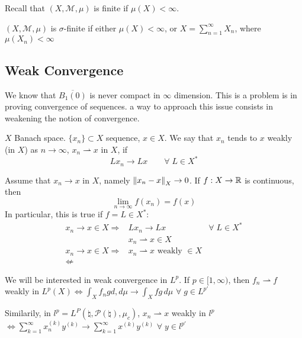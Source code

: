 Recall that \((X, \mathcal{M}, \mu)\) is finite if \(\mu(X) < \infty\).

\begin{definition}
    \((X, \mathcal{M}, \mu)\) is \(\sigma\)-finite if either \(\mu(X) < \infty\), or \(X = \sum_{n=1}^\infty X_n\), where \(\mu(X_n) < \infty\)
\end{definition}

\subsection*{Weak Convergence}

We know that \(\overline{B_1(0)}\) is never compact in \(\infty\) dimension. This is a problem is in proving convergence of sequences. a way to approach this issue consists in weakening the notion of convergence.
\begin{definition}
    \(X\) Banach space. \(\{x_n\} \subset X\) sequence, \(x \in X\). We say that \(x_n\) tends to \(x\) weakly (in \(X\)) as \(n \to \infty\), \(x_n \rightharpoonup x\) in \(X\), if 
    \[
        L x_n \to Lx \qquad \forall \; L \in X^*
    \]
\end{definition}
\begin{remark}
    Assume that \(x_n \to x\) in \(X\), namely \(\norm{x_n -x}_X \to 0\). If \(f:X \to \mathbb{R}\) is continuous, then
    \[
        \lim_{n \to \infty} f(x_n) = f(x)
    \]
    In particular, this is true if \(f = L \in X^*\):
    \[
        \begin{array}{rlc}
            x_n \to x \in X \Rightarrow & L x_n \to Lx & \forall\; L \in X^* \\
            & x_n \rightharpoonup x \in X & \\
            x_n \to x \in X \Rightarrow & x_n \rightharpoonup x \text{ weakly } \in X & \\
             \nLeftarrow & 
        \end{array}
    \]
\end{remark}
\begin{remark}
    We will be interested in weak convergence in \(L^p\). If \(p \in [1, \infty)\), then \(f_n \rightharpoonup f\) weakly in \(L^p(X) \iff \int_X f_n g d, d\mu \to \int_X fg \, d\mu\) \(\forall \; g \in L^{p'}\)

    Similarily, in \(l^p = L^P(\natural, \mathcal{P}(\natural), \mu_c)\), \(x_n \rightharpoonup x \) weakly in \(l^p\) \(\iff \sum_{k=1}^\infty x_n^{(k)} y^{(k)} \to \sum_{k=1}^\infty x^{(k)} y^{(k)}\) \(\forall \; y \in l^{p'}\)
\end{remark}

